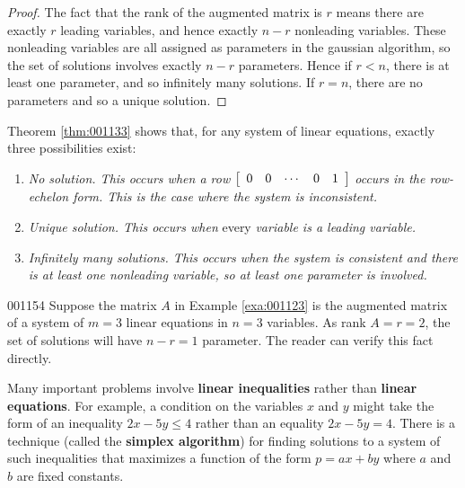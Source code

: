\begin{proof}
The fact that the rank of the augmented matrix is $r$ means there are exactly $r$ leading variables, and hence exactly $n - r$ nonleading variables. These nonleading variables are all assigned as parameters in the gaussian algorithm, so the set of solutions involves exactly $n - r$ parameters. Hence if $r < n$, there is at least one parameter, and so infinitely many solutions. If $r = n$, there are no parameters and so a unique solution.
\end{proof}

Theorem \ref{thm:001133} shows that, for any system of linear equations, exactly three possibilities exist:

\begin{enumerate}\raggedright
\item \textit{No solution. This occurs when a row} $\left[ \begin{array}{ccccc} 0 & 0 & \cdots & 0 & 1 \end{array} \right]$ \textit{occurs in the row-echelon form. This is the case where the system is inconsistent.}

\item \textit{Unique solution. This occurs when} every \textit{variable is a leading variable.}

\item \textit{Infinitely many solutions. This occurs when the system is consistent and there is at least one nonleading variable, so at least one parameter is involved.}

\end{enumerate}

\begin{example}{}{001154}
Suppose the matrix $A$ in Example \ref{exa:001123} is the augmented matrix of a system of $m = 3$ linear equations in $n = 3$ variables. As rank $A = r = 2$, the set of solutions will have $n - r = 1$ parameter. The reader can verify this fact directly.
\end{example}

Many important problems involve \textbf{linear inequalities} rather than \textbf{linear equations}. For example, a condition on the variables $x$ and $y$ might take the form of an inequality $2x - 5y \leq 4$ rather than an equality $2x - 5y = 4$. There is a technique (called the \textbf{simplex algorithm}) for finding solutions to a system of such inequalities that maximizes a function of the form $p = ax + by$ where $a$ and $b$ are fixed constants. 


